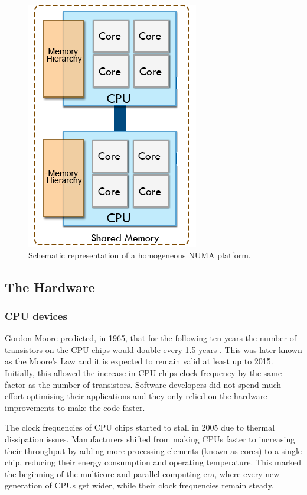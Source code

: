 \begin{figure}[!htp]
	\begin{center}
		\includegraphics[scale=0.45]{imgs/homoplats.png}
		\caption{Schematic representation of a homogeneous NUMA platform.}
		\label{fig:homoplat}
	\end{center}
\end{figure}

\subsection{The Hardware}

\subsubsection*{CPU devices}
\label{cpu_devices}

Gordon Moore predicted, in 1965, that for the following ten years the number of transistors on the CPU chips would double every 1.5 years \cite{MooreLaw}. This was later known as the Moore’s Law and it is expected to remain valid at least up to 2015. Initially, this allowed the increase in CPU chips clock frequency by the same factor as the number of transistors. Software developers did not spend much effort optimising their applications and they only relied on the hardware improvements to make the code faster.

The clock frequencies of CPU chips started to stall in 2005 due to thermal dissipation issues. Manufacturers shifted from making CPUs faster to increasing their throughput by adding more processing elements (known as cores) to a single chip, reducing their energy consumption and operating temperature. This marked the beginning of the multicore and parallel computing era, where every new generation of CPUs get wider, while their clock frequencies remain steady.

